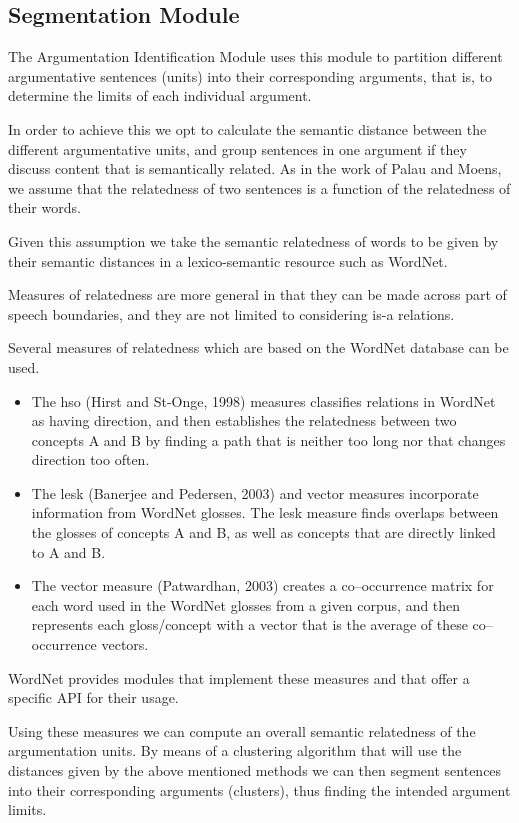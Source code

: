 \documentclass[lnbip]{svmultln}
\begin{document}
\subsection{Segmentation Module}
\par
The Argumentation Identification Module uses this module to partition different argumentative sentences (units) into their corresponding arguments, that is, to determine the limits of each individual argument.
\par
In order to achieve this we opt to calculate the semantic distance between the different argumentative units, and group sentences in one argument if they discuss content that is semantically related. As in the work of Palau and Moens, we assume that the relatedness of two sentences is a function of the relatedness of their words.
\par
Given this assumption we take the semantic relatedness of words to be given by their semantic distances in a lexico-semantic resource such as WordNet.
\par
Measures of relatedness are more general in that they can be made across part of speech boundaries, and they are not limited to considering is-a relations.
\par
Several measures of relatedness which are based on the WordNet database can be used.
\begin{itemize}
\item The hso (Hirst and St-Onge, 1998) measures classifies relations in WordNet as having direction, and then establishes the relatedness between two concepts A and B by finding a path that is neither too long nor that changes direction too often. 
\item The lesk (Banerjee and Pedersen, 2003) and vector measures incorporate information from WordNet glosses. The lesk measure finds overlaps between the glosses of concepts A and B, as well as concepts that are directly linked to A and B. 
\item The vector measure (Patwardhan, 2003) creates a co–occurrence matrix for each word used in the WordNet glosses from a given corpus, and then represents each gloss/concept with a vector that is the average of these co–occurrence vectors.
\end{itemize}
\par
WordNet provides modules that implement these measures and that offer a specific API for their usage.
\par
Using these measures we can compute an overall semantic relatedness of the argumentation units. By means of a clustering algorithm that will use the distances given by the above mentioned methods we can then segment sentences into their corresponding arguments (clusters), thus finding the intended argument limits.
\end{document}
